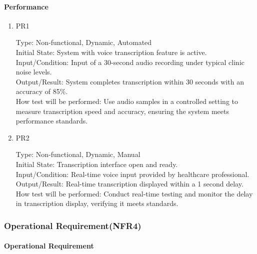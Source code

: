 \documentclass[12pt, titlepage]{article}
\begin{document}
\paragraph{Performance}

\begin{enumerate}
    \item{PR1\\}
    
    Type: Non-functional, Dynamic, Automated\\
    
    Initial State: System with voice transcription feature is active.\\
    
    Input/Condition: Input of a 30-second audio recording under typical clinic noise levels.\\
    
    Output/Result: System completes transcription within 30 seconds with an accuracy of 85\%.\\
    
    How test will be performed: Use audio samples in a controlled setting to measure transcription speed and accuracy, ensuring the system meets performance standards.

    \item{PR2\\}
    
    Type: Non-functional, Dynamic, Manual\\
    
    Initial State: Transcription interface open and ready.\\
    
    Input/Condition: Real-time voice input provided by healthcare professional.\\
    
    Output/Result: Real-time transcription displayed within a 1 second delay.\\
    
    How test will be performed: Conduct real-time testing and monitor the delay in transcription display, verifying it meets standards.
\end{enumerate}

\subsubsection{Operational Requirement(NFR4)}

\paragraph{Operational Requirement}
\end{document}

